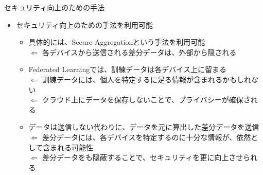 \documentclass[dvipdfmx,notheorems,t]{beamer}
\begin{document}
\begin{frame}{セキュリティ向上のための手法}

\begin{itemize}
	\item セキュリティ向上のための手法を利用可能
	\begin{itemize}
		\item 具体的には、\alert{Secure Aggregation}という手法を利用可能 \\
		$\Leftarrow$ 各デバイスから送信される差分データは、外部から隠される
		\newline
		
		\item Federated Learningでは、訓練データは各デバイス上に留まる \\
		$\Leftarrow$ 訓練データには、個人を特定するに足る情報が含まれるかもしれない \\
		$\Leftarrow$ クラウド上にデータを保存しないことで、プライバシーが確保される
		\newline
		
		\item データは送信しない代わりに、データを元に算出した差分データを送信 \\
		$\Leftarrow$ 差分データには、各デバイスを特定するのに十分な情報が、依然として含まれる可能性 \\
		$\Leftarrow$ 差分データをも隠蔽することで、セキュリティを更に向上させられる
	\end{itemize}
\end{itemize}

\end{frame}
\end{document}
